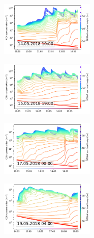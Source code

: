 \begin{figure}[H]
    \centering
    \begin{subfigure}
        \centering
        \includegraphics[width=0.49\textwidth]{sosaa-data/figures/trajectories/trajectory-14.05.2018:10.00-ccn.pdf}
    \end{subfigure}
    \begin{subfigure}
        \centering
        \includegraphics[width=0.49\textwidth]{sosaa-data/figures/trajectories/trajectory-15.05.2018:19.00-ccn.pdf}
    \end{subfigure}

    \begin{subfigure}
        \centering
        \includegraphics[width=0.49\textwidth]{sosaa-data/figures/trajectories/trajectory-17.05.2018:00.00-ccn.pdf}
    \end{subfigure}
    \begin{subfigure}
        \centering
        \includegraphics[width=0.49\textwidth]{sosaa-data/figures/trajectories/trajectory-19.05.2018:04.00-ccn.pdf}
    \end{subfigure}


\end{figure}
